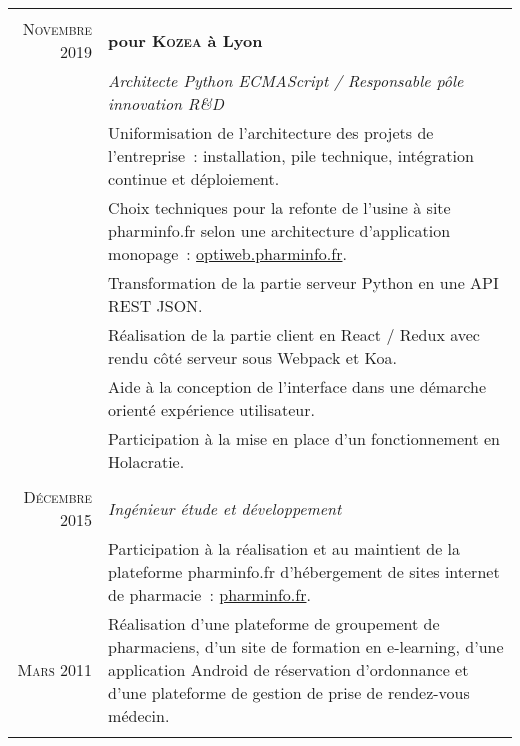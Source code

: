 \documentclass[a4paper,10pt]{article}
\begin{document}
  \begin{supertabular}{r|p{11cm}}
     \\
    \textsc{Novembre} 2019  & \textbf{pour \textsc{Kozea} à Lyon} \\
    & \emph{Architecte Python ECMAScript / Responsable pôle innovation R\&D} \\
    & \footnotesize{
      Uniformisation de l’architecture des projets de l’entreprise :
      installation, pile technique, intégration continue et déploiement.
    } \\
    & \footnotesize{
      Choix techniques pour la refonte de l’usine à site pharminfo.fr
      selon une architecture d’application monopage :
      \href{https://optiweb.pharminfo.fr}{optiweb.pharminfo.fr}.
    } \\
    & \footnotesize{
      Transformation de la partie serveur Python en une API REST JSON.
    } \\
    & \footnotesize{
      Réalisation de la partie client en React / Redux avec rendu côté serveur
      sous Webpack et Koa.
    } \\
    & \footnotesize{
      Aide à la conception de l’interface dans une démarche orienté expérience
      utilisateur.
    } \\
    & \footnotesize{
      Participation à la mise en place d’un fonctionnement en Holacratie.
    } \\
    \\
    \textsc{Décembre} 2015 & \emph{Ingénieur étude et développement} \\
    & \footnotesize{
      Participation à la réalisation et au maintient de la plateforme
      pharminfo.fr d’hébergement de sites internet de pharmacie :
      \href{https://www.pharminfo.fr}{pharminfo.fr}.
    } \\
     \footnotesize{\textsc{Mars} 2011}
    & \begin{minipage}[b]{0.85\textwidth}
      \footnotesize{
        Réalisation d'une plateforme de groupement de pharmaciens,
        d’un site de formation en e-learning,
        d'une application Android de réservation d’ordonnance et
        d'une plateforme de gestion de prise de rendez-vous médecin.
      }
    \end{minipage} \\

     \\


\end{supertabular}
\end{document}
